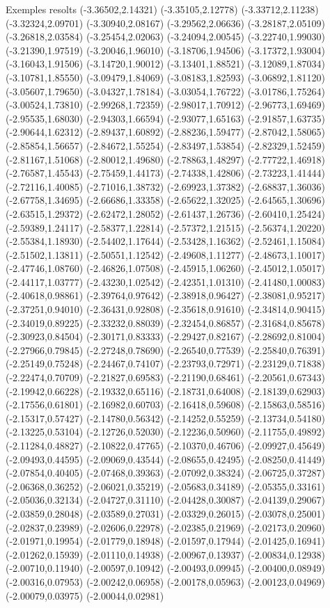 \documentclass[11pt,a4paper]{article}
\begin{document}
\begin{fmex}{Exemples resolts}
(-3.36502,2.14321) (-3.35105,2.12778) (-3.33712,2.11238) (-3.32324,2.09701) (-3.30940,2.08167) (-3.29562,2.06636) (-3.28187,2.05109) (-3.26818,2.03584) (-3.25454,2.02063) (-3.24094,2.00545) (-3.22740,1.99030) (-3.21390,1.97519) (-3.20046,1.96010) (-3.18706,1.94506) (-3.17372,1.93004) (-3.16043,1.91506) (-3.14720,1.90012) (-3.13401,1.88521) (-3.12089,1.87034) (-3.10781,1.85550) (-3.09479,1.84069) (-3.08183,1.82593) (-3.06892,1.81120) (-3.05607,1.79650) (-3.04327,1.78184) (-3.03054,1.76722) (-3.01786,1.75264) (-3.00524,1.73810) (-2.99268,1.72359) (-2.98017,1.70912) (-2.96773,1.69469) (-2.95535,1.68030) (-2.94303,1.66594) (-2.93077,1.65163) (-2.91857,1.63735) (-2.90644,1.62312) (-2.89437,1.60892) (-2.88236,1.59477) (-2.87042,1.58065) (-2.85854,1.56657) (-2.84672,1.55254) (-2.83497,1.53854) (-2.82329,1.52459) (-2.81167,1.51068) (-2.80012,1.49680) (-2.78863,1.48297) (-2.77722,1.46918) (-2.76587,1.45543) (-2.75459,1.44173) (-2.74338,1.42806) (-2.73223,1.41444) (-2.72116,1.40085) (-2.71016,1.38732) (-2.69923,1.37382) (-2.68837,1.36036) (-2.67758,1.34695) (-2.66686,1.33358) (-2.65622,1.32025) (-2.64565,1.30696) (-2.63515,1.29372) (-2.62472,1.28052) (-2.61437,1.26736) (-2.60410,1.25424) (-2.59389,1.24117) (-2.58377,1.22814) (-2.57372,1.21515) (-2.56374,1.20220) (-2.55384,1.18930) (-2.54402,1.17644) (-2.53428,1.16362) (-2.52461,1.15084) (-2.51502,1.13811) (-2.50551,1.12542) (-2.49608,1.11277) (-2.48673,1.10017) (-2.47746,1.08760) (-2.46826,1.07508) (-2.45915,1.06260) (-2.45012,1.05017) (-2.44117,1.03777) (-2.43230,1.02542) (-2.42351,1.01310) (-2.41480,1.00083) (-2.40618,0.98861) (-2.39764,0.97642) (-2.38918,0.96427) (-2.38081,0.95217) (-2.37251,0.94010) (-2.36431,0.92808) (-2.35618,0.91610) (-2.34814,0.90415) (-2.34019,0.89225) (-2.33232,0.88039) (-2.32454,0.86857) (-2.31684,0.85678) (-2.30923,0.84504) (-2.30171,0.83333) (-2.29427,0.82167) (-2.28692,0.81004) (-2.27966,0.79845) (-2.27248,0.78690) (-2.26540,0.77539) (-2.25840,0.76391) (-2.25149,0.75248) (-2.24467,0.74107) (-2.23793,0.72971) (-2.23129,0.71838) (-2.22474,0.70709) (-2.21827,0.69583) (-2.21190,0.68461) (-2.20561,0.67343) (-2.19942,0.66228) (-2.19332,0.65116) (-2.18731,0.64008) (-2.18139,0.62903) (-2.17556,0.61801) (-2.16982,0.60703) (-2.16418,0.59608) (-2.15863,0.58516) (-2.15317,0.57427) (-2.14780,0.56342) (-2.14252,0.55259) (-2.13734,0.54180) (-2.13225,0.53104) (-2.12726,0.52030) (-2.12236,0.50960) (-2.11755,0.49892) (-2.11284,0.48827) (-2.10822,0.47765) (-2.10370,0.46706) (-2.09927,0.45649) (-2.09493,0.44595) (-2.09069,0.43544) (-2.08655,0.42495) (-2.08250,0.41449) (-2.07854,0.40405) (-2.07468,0.39363) (-2.07092,0.38324) (-2.06725,0.37287) (-2.06368,0.36252) (-2.06021,0.35219) (-2.05683,0.34189) (-2.05355,0.33161) (-2.05036,0.32134) (-2.04727,0.31110) (-2.04428,0.30087) (-2.04139,0.29067) (-2.03859,0.28048) (-2.03589,0.27031) (-2.03329,0.26015) (-2.03078,0.25001) (-2.02837,0.23989) (-2.02606,0.22978) (-2.02385,0.21969) (-2.02173,0.20960) (-2.01971,0.19954) (-2.01779,0.18948) (-2.01597,0.17944) (-2.01425,0.16941) (-2.01262,0.15939) (-2.01110,0.14938) (-2.00967,0.13937) (-2.00834,0.12938) (-2.00710,0.11940) (-2.00597,0.10942) (-2.00493,0.09945) (-2.00400,0.08949) (-2.00316,0.07953) (-2.00242,0.06958) (-2.00178,0.05963) (-2.00123,0.04969) (-2.00079,0.03975) (-2.00044,0.02981) 
\end{fmex}
\end{document}
